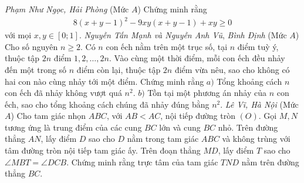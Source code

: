 \begin{multicols}{2}
\begin{figure}[H]
		\vspace*{-10pt}
	\end{figure}
	\hfill\textit{Phạm Như Ngọc, Hải Phòng}
	\vskip 0.1cm
	{}
	(Mức $A$) Chứng minh rằng
	\begin{align*}
		8(x+y-1)^2-9xy(x+y-1)+xy\ge0
	\end{align*}
	với mọi $x,y\in[0;1]$. 
	\vskip 0.1cm
		\hfill\textit{Nguyễn Tấn Mạnh và Nguyễn Anh Vũ}, 
		\vskip 0.01cm
		\hfill \textit{Bình Định}
	\vskip 0.1cm
	{}
	(Mức $A$) Cho số nguyên $n\ge2$. Có $n$ con ếch nằm trên một trục số, tại $n$ điểm tuỳ ý, thuộc tập $2n$ điểm $1,2,\ldots,2n$. Vào cùng một thời điểm, mỗi con ếch đều nhảy đến một trong số $n$ điểm còn lại, thuộc tập $2n$ điểm vừa nêu, sao cho không có hai con nào cùng nhảy tới một điểm. Chứng minh rằng
	\vskip 0.05cm
	$a)$ Tổng khoảng cách $n$ con ếch đã nhảy không vượt quá $n^2$. 
	\vskip 0.05cm
	$b)$ Tồn tại một phương án nhảy của $n$ con ếch, sao cho tổng khoảng cách chúng đã nhảy đúng bằng $n^2$. 
	\vskip 0.1cm
	\hfill	\textit{Lê Vĩ, Hà Nội}
	\vskip 0.1cm
	{}
	(Mức $A$) Cho tam giác nhọn $ABC$, với $AB<AC$, nội tiếp đường tròn $(O)$. Gọi $M,N$ tương ứng là trung điểm của các cung $BC$ lớn và cung $BC$ nhỏ. Trên đường thẳng $AN$, lấy điểm $D$ sao cho $D$ nằm trong tam giác $ABC$ và không trùng với tâm đường tròn nội tiếp tam giác ấy. Trên đoạn thẳng $MD$, lấy điểm $T$ sao cho $\angle{MBT}=\angle{DCB}$. Chứng minh rằng trực tâm của tam giác $TND$ nằm trên đường thẳng $BC$.

\end{multicols}
